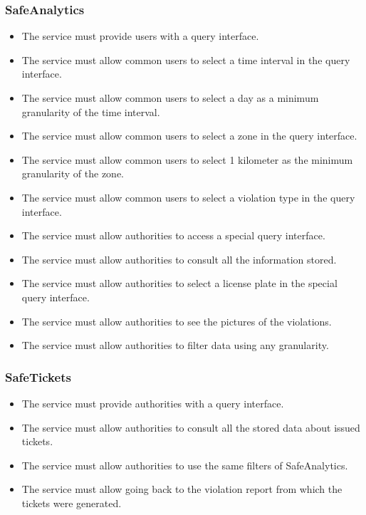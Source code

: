 \documentclass[a4paper]{article}
\begin{document}
\subsubsection{SafeAnalytics}

\begin{itemize}
\item
  The service must provide users with a query interface.
\item
  The service must allow common users to select a time interval in the
  query interface.
\item
  The service must allow common users to select a day as a minimum
  granularity of the time interval.
\item
  The service must allow common users to select a zone in the query
  interface.
\item
  The service must allow common users to select 1 kilometer as the
  minimum granularity of the zone.
\item
  The service must allow common users to select a violation type in the
  query interface.
\item
  The service must allow authorities to access a special query
  interface.
\item
  The service must allow authorities to consult all the information
  stored.
\item
  The service must allow authorities to select a license plate in the
  special query interface.
\item
  The service must allow authorities to see the pictures of the
  violations.
\item
  The service must allow authorities to filter data using any
  granularity.
\end{itemize}

\subsubsection{SafeTickets}

\begin{itemize}
\item
  The service must provide authorities with a query interface.
\item
  The service must allow authorities to consult all the stored data
  about issued tickets.
\item
  The service must allow authorities to use the same filters of
  SafeAnalytics.
\item
  The service must allow going back to the violation report from which
  the tickets were generated.
\end{itemize}
\end{document}
